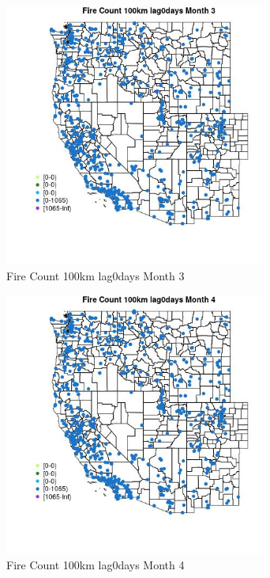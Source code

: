 \begin{figure} 
\centering  
\includegraphics[width=0.77\textwidth]{Code_Outputs/Report_ML_input_PM25_Step4_part_f_de_duplicated_aveswNAs_MapObsMo3Fire_Count_100km_lag0days.jpg} 
\caption{\label{fig:Report_ML_input_PM25_Step4_part_f_de_duplicated_aveswNAsMapObsMo3Fire_Count_100km_lag0days}Fire Count 100km lag0days Month 3} 
\end{figure} 
 

\clearpage 

\begin{figure} 
\centering  
\includegraphics[width=0.77\textwidth]{Code_Outputs/Report_ML_input_PM25_Step4_part_f_de_duplicated_aveswNAs_MapObsMo4Fire_Count_100km_lag0days.jpg} 
\caption{\label{fig:Report_ML_input_PM25_Step4_part_f_de_duplicated_aveswNAsMapObsMo4Fire_Count_100km_lag0days}Fire Count 100km lag0days Month 4} 
\end{figure} 
 

